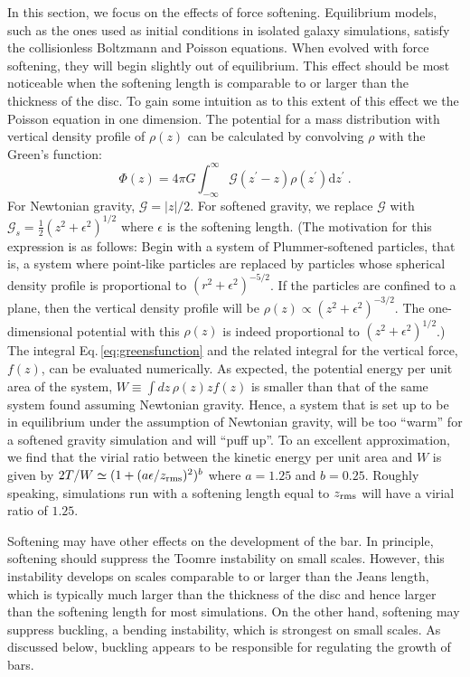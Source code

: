 In this section, we focus on the effects of force softening.
Equilibrium models, such as the ones used as initial conditions in
isolated galaxy simulations, satisfy the collisionless Boltzmann and
Poisson equations.  When evolved with force softening, they will begin
slightly out of equilibrium.  This effect should be most noticeable
when the softening length is comparable to or larger than the
thickness of the disc.  To gain some intuition as to this extent of
this effect we the Poisson equation in one dimension.  The potential
for a mass distribution with vertical density profile of $\rho(z)$ can
be calculated by convolving $\rho$ with the Green's function:
\begin{equation}\label{eq:greensfunction}
\Phi(z)= 4\pi G\int_{-\infty}^{\infty} \mathcal{G}(z^\prime - z)
\rho(z^\prime) \text{d} z^\prime~.
\end{equation}
For Newtonian gravity, $\mathcal{G} = |z|/2$.  For softened gravity,
we replace $\mathcal{G}$ with $\mathcal{G}_s = \frac{1}{2}\left (z^2 +
\epsilon^2\right )^{1/2}$ where $\epsilon$ is the softening length.
(The motivation for this expression is as follows: Begin with a system
of Plummer-softened particles, that is, a system where point-like
particles are replaced by particles whose spherical density profile is
proportional to $\left (r^2 + \epsilon^2\right )^{-5/2}$.  If the
particles are confined to a plane, then the vertical density profile
will be $\rho(z)\propto \left (z^2 + \epsilon^2\right )^{-3/2}$.  The
one-dimensional potential with this $\rho(z)$ is indeed proportional
to $\left (z^2 + \epsilon^2\right )^{1/2}$.)  The integral
Eq.\,\ref{eq:greensfunction} and the related integral for the vertical
force, $f(z)$, can be evaluated numerically.  As expected, the
potential energy per unit area of the system, $W \equiv \int
dz\,\rho(z) z f(z)$ is smaller than that of the same system found
assuming Newtonian gravity.  Hence, a system that is set up to be in
equilibrium under the assumption of Newtonian gravity, will be too
``warm'' for a softened gravity simulation and will ``puff up''.  To
an excellent approximation, we find that the virial ratio between the
kinetic energy per unit area and $W$ is given by $2T/W \simeq (1 +
(a\epsilon/z_{\rm rms})^2)^{b}$ where $a = 1.25$ and $b = 0.25$.  Roughly
speaking, simulations run with a softening length equal to $z_{\rm rms}$
will have a virial ratio of $1.25$.

Softening may have other effects on the development of the bar.  In
principle, softening should suppress the Toomre instability on small
scales.  However, this instability develops on scales comparable to or
larger than the Jeans length, which is typically much larger than the
thickness of the disc and hence larger than the softening length for
most simulations.  On the other hand, softening may suppress buckling,
a bending instability, which is strongest on small scales.  As
discussed below, buckling appears to be responsible for regulating the
growth of bars.

